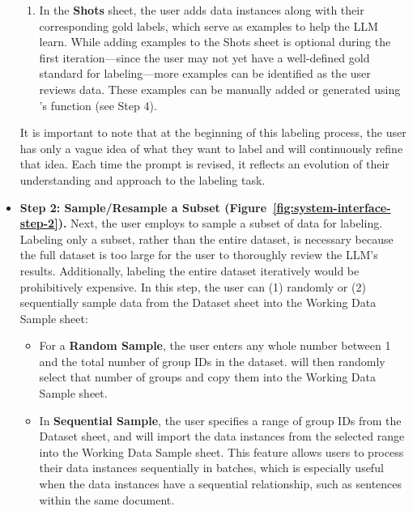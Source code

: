 \begin{itemize}
\begin{enumerate}
\item
In the \textbf{Shots} sheet, the user adds data instances along with their corresponding gold labels, which serve as examples to help the LLM learn. While adding examples to the Shots sheet is optional during the first iteration---since the user may not yet have a well-defined gold standard for labeling---more examples can be identified as the user reviews data. These examples can be manually added or generated using \system's function (see Step 4).
\end{enumerate}
It is important to note that at the beginning of this labeling process, the user has only a vague idea of what they want to label and will continuously refine that idea. 
Each time the prompt is revised, it reflects an evolution of their understanding and approach to the labeling task.


\item 
\textbf{Step 2: Sample/Resample a Subset (Figure~\ref{fig:system-interface-step-2}).}
Next, the user employs \system to sample a subset of data for labeling. 
Labeling only a subset, rather than the entire dataset, is necessary because the full dataset is too large for the user to thoroughly review the LLM's results. 
Additionally, labeling the entire dataset iteratively would be prohibitively expensive. 
In this step, the user can (1) randomly or (2) sequentially sample data from the Dataset sheet into the Working Data Sample sheet:

\begin{itemize}

\item 
For a \textbf{Random Sample}, the user enters any whole number between 1 and the total number of group IDs in the dataset.
\system will then randomly select that number of groups and copy them into the Working Data Sample sheet. 

\item
In \textbf{Sequential Sample}, the user specifies a range of group IDs from the Dataset sheet, and \system will import the data instances from the selected range into the Working Data Sample sheet.
This feature allows users to process their data instances sequentially in batches, which is especially useful when the data instances have a sequential relationship, such as sentences within the same document.




\end{itemize}
\end{itemize}

